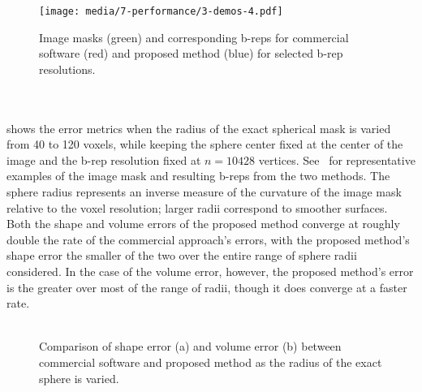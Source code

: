 \begin{figure}[ht!]
	\centering
	\texttt{[image: media/7-performance/3-demos-4.pdf]}
	\caption{Image masks (green) and corresponding b-reps for commercial software (red) and proposed method (blue) for selected b-rep resolutions.}
	\label{fig:demos1}
\end{figure} \\ \\
%
 shows the error metrics when the radius of the exact spherical mask is varied from 40 to 120 voxels, while keeping the sphere center fixed at the center of the image and the b-rep resolution fixed at $n = 10428$ vertices. See~ for representative examples of the image mask and resulting b-reps from the two methods. The sphere radius represents an inverse measure of the curvature of the image mask relative to the voxel resolution; larger radii correspond to smoother surfaces. Both the shape and volume errors of the proposed method converge at roughly double the rate of the commercial approach's errors, with the proposed method's shape error the smaller of the two over the entire range of sphere radii considered.  In the case of the volume error, however, the proposed method's error is the greater over most of the range of radii, though it does converge at a faster rate. \\ \\
\begin{figure}[b!]
	\centering
	\caption{Comparison of shape error (a) and volume error (b) between commercial software and proposed method as the radius of the exact sphere is varied.}
	\label{fig:graph2}
\end{figure}
